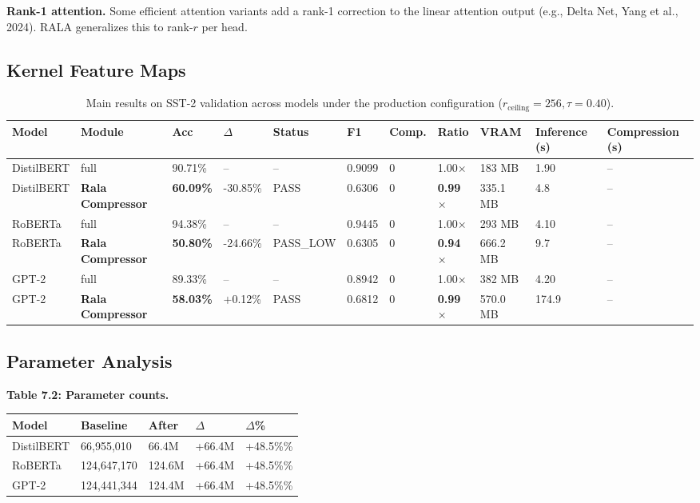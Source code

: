 \textbf{Rank-1 attention.} Some efficient attention variants add a rank-1 
correction to the linear attention output (e.g., Delta Net, Yang et al., 
2024). RALA generalizes this to rank-$r$ per head.

\subsection{Kernel Feature Maps}

\begin{table}[t]
\centering
\small
\begin{tabular}{lllllllllll}
\toprule
\textbf{Model} & \textbf{Module} & \textbf{Acc} & \textbf{$\Delta$} & \textbf{Status} & \textbf{F1} & \textbf{Comp.} & \textbf{Ratio} & \textbf{VRAM} & \textbf{Inference (s)} & \textbf{Compression (s)} \\
\midrule
DistilBERT & full & 90.71\% & -- & -- & 0.9099 & 0 & 1.00$\times$ & 183 MB & 1.90 & -- \\
DistilBERT & \textbf{Rala Compressor} & \textbf{60.09\%} & -30.85\% & PASS & 0.6306 & 0 & \textbf{0.99$\times$} & 335.1 MB & 4.8 & -- \\
RoBERTa & full & 94.38\% & -- & -- & 0.9445 & 0 & 1.00$\times$ & 293 MB & 4.10 & -- \\
RoBERTa & \textbf{Rala Compressor} & \textbf{50.80\%} & -24.66\% & PASS_LOW & 0.6305 & 0 & \textbf{0.94$\times$} & 666.2 MB & 9.7 & -- \\
GPT-2 & full & 89.33\% & -- & -- & 0.8942 & 0 & 1.00$\times$ & 382 MB & 4.20 & -- \\
GPT-2 & \textbf{Rala Compressor} & \textbf{58.03\%} & +0.12\% & PASS & 0.6812 & 0 & \textbf{0.99$\times$} & 570.0 MB & 174.9 & -- \\
\bottomrule
\end{tabular}
\caption{Main results on SST-2 validation across models under the production configuration ($r_{\mathrm{ceiling}}=256, \tau=0.40$).}
\label{tab:main_sst2}
\end{table}

\subsection{Parameter Analysis}

\textbf{Table 7.2: Parameter counts.}

\begin{table}[H]
\centering
\small
\begin{tabular}{lllll}
\toprule
\textbf{Model} & \textbf{Baseline} & \textbf{After} & \textbf{$\Delta$} & \textbf{$\Delta$\%} \\
\midrule
DistilBERT & 66,955,010 & 66.4M & +66.4M & +48.5\%\% \\
RoBERTa & 124,647,170 & 124.6M & +66.4M & +48.5\%\% \\
GPT-2 & 124,441,344 & 124.4M & +66.4M & +48.5\%\% \\
\bottomrule
\end{tabular}
\end{table}

